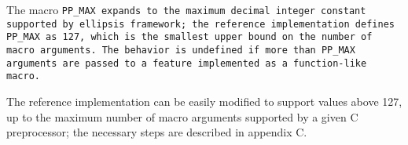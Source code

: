 The macro \tt{PP_MAX} expands to the maximum decimal integer constant supported
by ellipsis framework; the reference implementation defines \tt{PP_MAX} as 127,
which is the smallest upper bound on the number of macro arguments.
The behavior is undefined if more than \tt{PP_MAX} arguments
are passed to a feature implemented as a function-like macro.

\note The reference implementation can be easily modified to support
values above 127, up to the maximum number of macro arguments supported
by a given C preprocessor; the necessary steps are described in appendix C.
